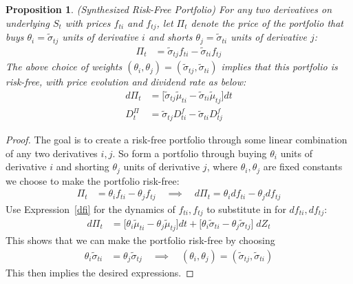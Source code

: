 \documentclass[12pt]{article}
\theoremstyle{plain}
\newtheorem{prop}[thm]{Proposition}
\theoremstyle{definition}
\theoremstyle{remark}
\begin{document}
\begin{prop}\emph{(Synthesized Risk-Free Portfolio)}
\label{synthport}
For any two derivatives on underlying $S_t$ with prices $f_{ti}$ and
$f_{tj}$, let $\Pi_t$ denote the price of the portfolio that buys
$\theta_i=\tilde{\sigma}_{tj}$ units of derivative $i$ and shorts
$\theta_j=\tilde{\sigma}_{ti}$ units of derivative $j$:
\begin{align*}
  \Pi_t
  &=
  \tilde{\sigma}_{tj}
  f_{ti}
  -
  \tilde{\sigma}_{ti}
  f_{tj}
\end{align*}
The above choice of weights
$(\theta_i,\theta_j)=(\tilde{\sigma}_{tj},\tilde{\sigma}_{ti})$ implies
that this portfolio is risk-free, with price evolution and dividend rate
as below:
\begin{align}
  d\Pi_t
  &=
  \big[
  \tilde{\sigma}_{tj}\tilde{\mu}_{ti}
  -
  \tilde{\sigma}_{ti}\tilde{\mu}_{tj}
  \big]
  dt
  \label{portevol}
  \\
  D_t^\Pi
  &=
  \tilde{\sigma}_{tj}
  D_{ti}^f
  -
  \tilde{\sigma}_{ti}
  D_{tj}^f
\end{align}
\end{prop}
\begin{proof}
The goal is to create a risk-free portfolio through some linear
combination of any two derivatives $i,j$.
So form a portfolio through buying $\theta_i$ units of derivative $i$
and shorting $\theta_j$ units of derivative $j$, where
$\theta_i,\theta_j$ are fixed constants we choose to make the
portfolio risk-free:
\begin{align*}
  \Pi_t
  &= \theta_i f_{ti} - \theta_j f_{tj}
  \quad\implies\quad
  d\Pi_t
  = \theta_i df_{ti} - \theta_j df_{tj}
\end{align*}
Use Expression~\ref{dfi} for the dynamics of $f_{ti},f_{tj}$ to
substitute in for $df_{ti},df_{tj}$:
\begin{align*}
  d\Pi_t
  &=
  \big[
  \theta_i\tilde{\mu}_{ti}
  -
  \theta_j\tilde{\mu}_{tj}
  \big]
  dt
  +
  \big[
  \theta_i\tilde{\sigma}_{ti}
  -
  \theta_j\tilde{\sigma}_{tj}
  \big]
  \;dZ_t
\end{align*}
This shows that we can make the portfolio risk-free by choosing
\begin{align*}
  \theta_i\tilde{\sigma}_{ti}
  &=
  \theta_j\tilde{\sigma}_{tj}
  \quad\implies\quad
  (\theta_i,\theta_j)=(\tilde{\sigma}_{tj},\tilde{\sigma}_{ti})
\end{align*}
This then implies the desired expressions.
\end{proof}
\end{document}
